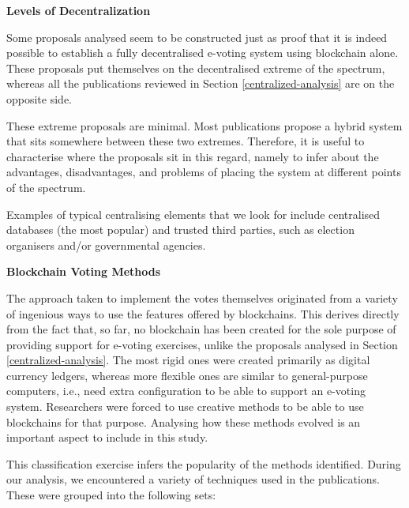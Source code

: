 \documentclass[../access.tex]{subfiles}
\begin{document}
    \par
	\textbf{Levels of Decentralization}
    \par
        Some proposals analysed seem to be constructed just as proof that it is indeed possible to establish a fully decentralised e-voting system using blockchain alone. These proposals put themselves on the decentralised extreme of the spectrum, whereas all the publications reviewed in Section \ref{centralized-analysis} are on the opposite side.
		\par
        These extreme proposals are minimal. Most publications propose a hybrid system that sits somewhere between these two extremes. Therefore, it is useful to characterise where the proposals sit in this regard, namely to infer about the advantages, disadvantages, and problems of placing the system at different points of the spectrum.
        \par
        Examples of typical centralising elements that we look for include centralised databases (the most popular) and trusted third parties, such as election organisers and/or governmental agencies.
    \par
	\textbf{Blockchain Voting Methods}
    \par
        The approach taken to implement the votes themselves originated from a variety of ingenious ways to use the features offered by blockchains. This derives directly from the fact that, so far, no blockchain has been created for the sole purpose of providing support for e-voting exercises, unlike the proposals analysed in Section \ref{centralized-analysis}. The most rigid ones were created primarily as digital currency ledgers, whereas more flexible ones are similar to general-purpose computers, i.e., need extra configuration to be able to support an e-voting system. Researchers were forced to use creative methods to be able to use blockchains for that purpose. Analysing how these methods evolved is an important aspect to include in this study.
        \par
        This classification exercise infers the popularity of the methods identified. During our analysis, we encountered a variety of techniques used in the publications. These were grouped into the following sets:
\end{document}
